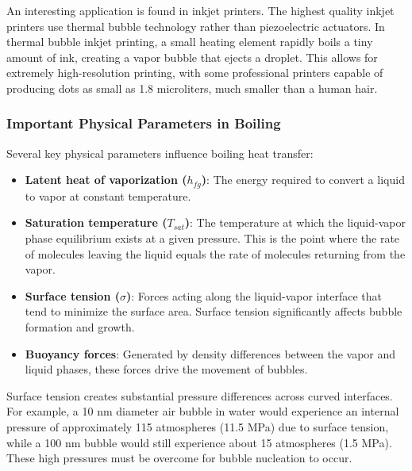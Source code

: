 An interesting application is found in inkjet printers. The highest quality inkjet printers use thermal bubble technology rather than piezoelectric actuators. In thermal bubble inkjet printing, a small heating element rapidly boils a tiny amount of ink, creating a vapor bubble that ejects a droplet. This allows for extremely high-resolution printing, with some professional printers capable of producing dots as small as 1.8 microliters, much smaller than a human hair.
\subsubsection*{Important Physical Parameters in Boiling}
Several key physical parameters influence boiling heat transfer:

\begin{itemize}
    \item \textbf{Latent heat of vaporization ($h_{fg}$)}: The energy required to convert a liquid to vapor at constant temperature.
    
    \item \textbf{Saturation temperature ($T_{sat}$)}: The temperature at which the liquid-vapor phase equilibrium exists at a given pressure. This is the point where the rate of molecules leaving the liquid equals the rate of molecules returning from the vapor.
    
    \item \textbf{Surface tension ($\sigma$)}: Forces acting along the liquid-vapor interface that tend to minimize the surface area. Surface tension significantly affects bubble formation and growth.
    
    \item \textbf{Buoyancy forces}: Generated by density differences between the vapor and liquid phases, these forces drive the movement of bubbles.
\end{itemize}

Surface tension creates substantial pressure differences across curved interfaces. For example, a 10 nm diameter air bubble in water would experience an internal pressure of approximately 115 atmospheres (11.5 MPa) due to surface tension, while a 100 nm bubble would still experience about 15 atmospheres (1.5 MPa). These high pressures must be overcome for bubble nucleation to occur.

